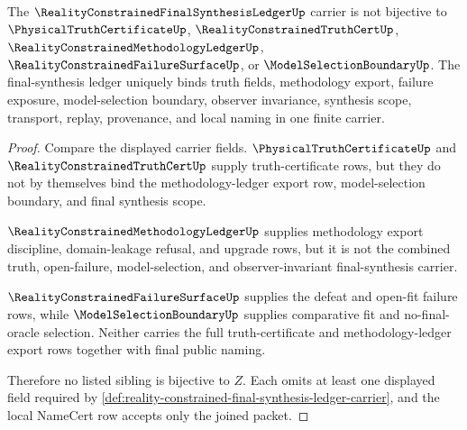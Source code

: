 \begin{theorem}
\label{thm:reality-constrained-final-synthesis-ledger-sibling-independence}
The $\RealityConstrainedFinalSynthesisLedgerUp$ carrier is not bijective to $\PhysicalTruthCertificateUp$, $\RealityConstrainedTruthCertUp$, $\RealityConstrainedMethodologyLedgerUp$, $\RealityConstrainedFailureSurfaceUp$, or $\ModelSelectionBoundaryUp$. The final-synthesis ledger uniquely binds truth fields, methodology export, failure exposure, model-selection boundary, observer invariance, synthesis scope, transport, replay, provenance, and local naming in one finite carrier.
\end{theorem}
\begin{proof}
Compare the displayed carrier fields. $\PhysicalTruthCertificateUp$ and $\RealityConstrainedTruthCertUp$ supply truth-certificate rows, but they do not by themselves bind the methodology-ledger export row, model-selection boundary, and final synthesis scope.

$\RealityConstrainedMethodologyLedgerUp$ supplies methodology export discipline, domain-leakage refusal, and upgrade rows, but it is not the combined truth, open-failure, model-selection, and observer-invariant final-synthesis carrier.

$\RealityConstrainedFailureSurfaceUp$ supplies the defeat and open-fit failure rows, while $\ModelSelectionBoundaryUp$ supplies comparative fit and no-final-oracle selection. Neither carries the full truth-certificate and methodology-ledger export rows together with final public naming.

Therefore no listed sibling is bijective to $Z$. Each omits at least one displayed field required by \autoref{def:reality-constrained-final-synthesis-ledger-carrier}, and the local NameCert row accepts only the joined packet.
\end{proof}

